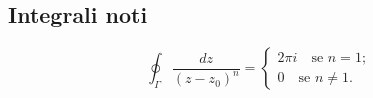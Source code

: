 \subsection*{Integrali noti}

\begin{equation*}
    \oint_{\Gamma}\frac{dz}{(z-z_0)^n} = 
    \begin{cases}
        2\pi i\quad \text{se }n=1;\\
        0\quad \text{se } n\neq1.
    \end{cases}
\end{equation*}

